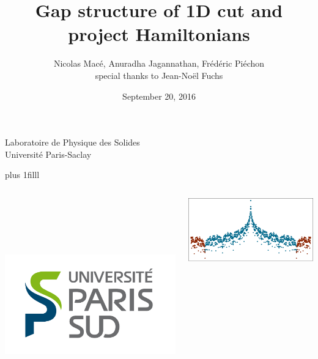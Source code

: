 \documentclass[xcolor=x11names,compress,professionalfonts]{beamer}
\newcommand{\btVFill}{\vskip0pt plus 1filll}%
\renewcommand{\(}{\begin{columns}}
\renewcommand{\)}{\end{columns}}
\newcommand{\<}[1]{\begin{column}{#1}}
\renewcommand{\>}{\end{column}}
\begin{document}
\begin{frame}
\title{{\fontsize{14}{60}\selectfont Gap structure of 1D cut and project Hamiltonians}}

\author{Nicolas Macé, Anuradha Jagannathan, Frédéric Piéchon \\ special thanks to Jean-Noël Fuchs}

\institute %
{
  Laboratoire de Physique des Solides\\
  Université Paris-Saclay
}

\date{September 20, 2016}

\titlepage

\btVFill
\begin{columns}
\begin{column}{2cm}
~\\
~\\
~\\
~\\
\raggedright
\includegraphics[scale=.15]{img/LogoUPSUD.png}
\end{column}
\begin{column}{6cm}
\centering
\includegraphics[width=1.\textwidth]{img/cover_illustration.pdf}

\end{column}
\end{columns}
\end{frame}
\end{document}
